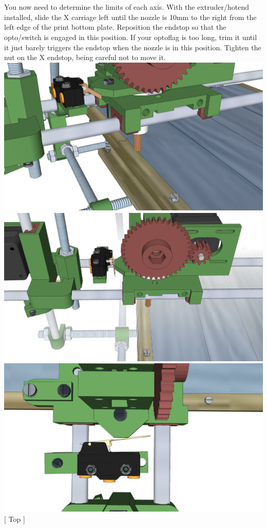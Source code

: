 \documentclass[twoside,openany,a4paper,titlepage]{memoir}
\begin{document}
	\section{}
	You now need to determine the limits of each axis. With the extruder/hotend installed, slide the X
	carriage left until the nozzle is 10mm to the right from the left edge of the print bottom plate. Reposition
	the endstop so that the opto/switch is engaged in this position. If your optoflag is too long, trim it until it
	just barely triggers the endstop when the nozzle is in this position. Tighten the nut on the X endstop,
	being careful not to move it.\\
	\includegraphics[width=1\linewidth]{graphics/ch10_7_1.png}
	\includegraphics[width=1\linewidth]{graphics/ch10_7_2.png}
	\includegraphics[width=1\linewidth]{graphics/ch10_7_3.png}
	[ Top ]
	
\end{document}
